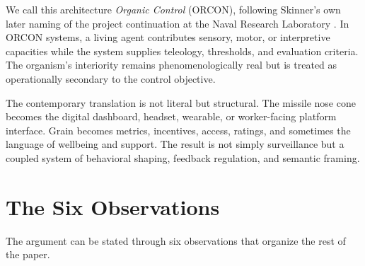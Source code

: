 \documentclass[11pt, a4paper]{article}
\begin{document}
We call this architecture \emph{Organic Control} (ORCON), following Skinner's own later naming of the project continuation at the Naval Research Laboratory \cite{skinner1960pigeons}. In ORCON systems, a living agent contributes sensory, motor, or interpretive capacities while the system supplies teleology, thresholds, and evaluation criteria. The organism's interiority remains phenomenologically real but is treated as operationally secondary to the control objective.

The contemporary translation is not literal but structural. The missile nose cone becomes the digital dashboard, headset, wearable, or worker-facing platform interface. Grain becomes metrics, incentives, access, ratings, and sometimes the language of wellbeing and support. The result is not simply surveillance but a coupled system of behavioral shaping, feedback regulation, and semantic framing.

\section{The Six Observations}

The argument can be stated through six observations that organize the rest of the paper.
\end{document}
